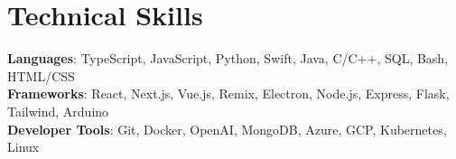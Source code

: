 \documentclass[letterpaper,11pt]{article}
\begin{document}
%
\section{Technical Skills}
 \begin{itemize}[leftmargin=0.15in, label={}]
    \small{\item{
     \textbf{Languages}{: TypeScript, JavaScript, Python, Swift, Java, C/C++, SQL, Bash, HTML/CSS} \\
     \textbf{Frameworks}{: React, Next.js, Vue.js, Remix, Electron, Node.js, Express, Flask, Tailwind, Arduino} \\
     \textbf{Developer Tools}{: Git, Docker, OpenAI, MongoDB, Azure, GCP, Kubernetes, Linux} \\
    }}
 \end{itemize}


\end{document}
